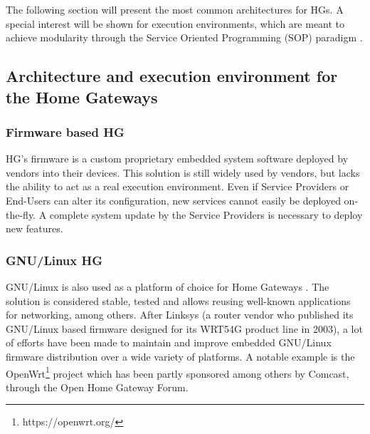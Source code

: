  
The following section will present the most common architectures for HGs.
A special interest will be shown for execution environments, which are meant to achieve modularity through the Service Oriented Programming (SOP) paradigm \cite{bieber2001introduction}.


\subsection{Architecture and execution environment for the Home Gateways}

\subsubsection{Firmware based HG}
HG's firmware is a custom proprietary embedded system software deployed by vendors into their devices.
This solution is still widely used by vendors, but lacks the ability to act as a real execution environment.
Even if Service Providers or End-Users can alter its configuration, new services cannot easily be deployed on-the-fly.
A complete system update by the Service Providers is necessary to deploy new features.
   
\subsubsection{GNU/Linux HG}
   
GNU/Linux is also used as a platform of choice for Home Gateways \cite{royon_multiservice_2007}.
The solution is considered stable, tested and allows reusing well-known applications for networking, among others.
After Linksys (a router vendor who published its GNU/Linux based firmware designed for its WRT54G product line in 2003), a lot of efforts have been made to maintain and improve embedded GNU/Linux firmware distribution over a wide variety of platforms.
A notable example is the OpenWrt\footnote{https://openwrt.org/} project which has been partly sponsored among others by Comcast, through the Open Home Gateway Forum.

